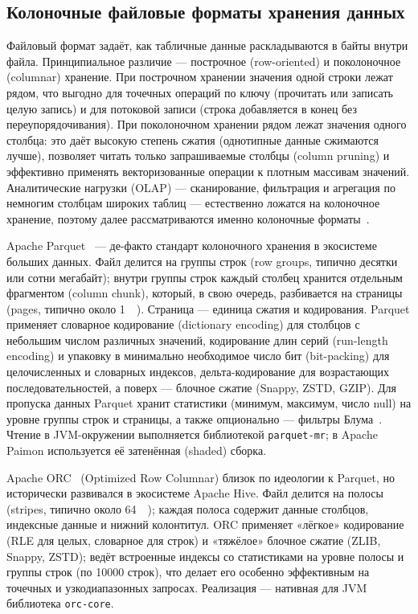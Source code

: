 \subsection{Колоночные файловые форматы хранения данных}

Файловый формат задаёт, как табличные данные раскладываются в байты внутри файла.
Принципиальное различие --- построчное (row-oriented) и поколоночное (columnar)
хранение. При построчном хранении значения одной строки лежат рядом, что выгодно для
точечных операций по ключу (прочитать или записать целую запись) и для потоковой
записи (строка добавляется в конец без переупорядочивания). При поколоночном
хранении рядом лежат значения одного столбца: это даёт высокую степень сжатия
(однотипные данные сжимаются лучше), позволяет читать только запрашиваемые столбцы
(column pruning) и эффективно применять векторизованные операции к плотным массивам
значений. Аналитические нагрузки (OLAP) --- сканирование, фильтрация и агрегация по
немногим столбцам широких таблиц --- естественно ложатся на колоночное хранение,
поэтому далее рассматриваются именно колоночные форматы~\cite{stonebraker2005cstore, abadi2013column}.

Apache Parquet~\cite{parquet-format} --- де-факто стандарт колоночного хранения в экосистеме
больших данных. Файл делится на группы строк (row groups, типично десятки или сотни
мегабайт); внутри группы строк каждый столбец хранится отдельным фрагментом (column
chunk), который, в свою очередь, разбивается на страницы (pages, типично около
\SI{1}{\mega\byte}). Страница --- единица сжатия и кодирования. Parquet применяет
словарное кодирование (dictionary encoding) для столбцов с небольшим числом
различных значений, кодирование длин серий (run-length encoding) и упаковку в
минимально необходимое число бит (bit-packing) для целочисленных и словарных
индексов, дельта-кодирование для возрастающих последовательностей, а поверх ---
блочное сжатие (Snappy, ZSTD, GZIP). Для пропуска данных Parquet хранит статистики
(минимум, максимум, число null) на уровне группы строк и страницы, а также
опционально --- фильтры Блума~\cite{bloom1970space}. Чтение в JVM-окружении выполняется библиотекой
\texttt{parquet-mr}; в Apache Paimon используется её затенённая (shaded) сборка.

Apache ORC~\cite{orc-spec} (Optimized Row Columnar) близок по идеологии к Parquet, но
исторически развивался в экосистеме Apache Hive. Файл делится на полосы (stripes,
типично около \SI{64}{\mega\byte}); каждая полоса содержит данные столбцов, индексные
данные и нижний колонтитул. ORC применяет «лёгкое» кодирование (RLE для целых,
словарное для строк) и «тяжёлое» блочное сжатие (ZLIB, Snappy, ZSTD); ведёт
встроенные индексы со статистиками на уровне полосы и группы строк (по \num{10000}
строк), что делает его особенно эффективным на точечных и узкодиапазонных запросах.
Реализация --- нативная для JVM библиотека \texttt{orc-core}.


